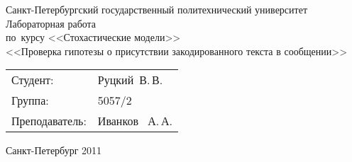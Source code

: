 %
%

\begin{titlepage} %

\begin{center} %

\large Санкт-Петербургский государственный политехнический университет\\[5.5cm]

\huge Лабораторная работа\\[0.6cm] %
\large по~курсу <<Стохастические модели>>\\[1cm]
\large <<Проверка гипотезы о присутствии закодированного текста в сообщении>>\\[6cm]

\begin{flushright} %
\begin{tabular}{l l}
Студент: & Руцкий~В.\,В.\\
Группа: & 5057/2\\
Преподаватель: & Иванков ~А.\,А.
\end{tabular}
\end{flushright} %

\vfill %

{\large Санкт-Петербург 2011}
\end{center} %
\thispagestyle{empty} %
\end{titlepage} %
